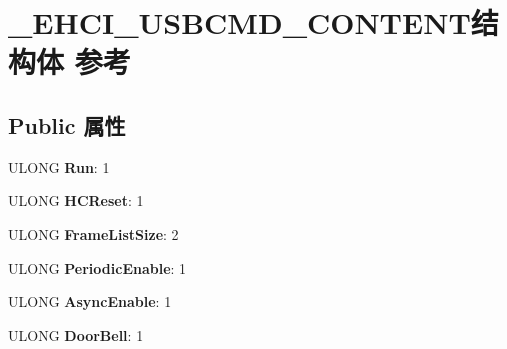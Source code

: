 \hypertarget{struct___e_h_c_i___u_s_b_c_m_d___c_o_n_t_e_n_t}{}\section{\+\_\+\+E\+H\+C\+I\+\_\+\+U\+S\+B\+C\+M\+D\+\_\+\+C\+O\+N\+T\+E\+N\+T结构体 参考}
\label{struct___e_h_c_i___u_s_b_c_m_d___c_o_n_t_e_n_t}
\subsection*{Public 属性}
\begin{DoxyCompactItemize}
\item 
\mbox{\label{struct___e_h_c_i___u_s_b_c_m_d___c_o_n_t_e_n_t_a17f0f6c4362c7cd9a99082a18525ad6a}} 
U\+L\+O\+NG {\bfseries Run}\+: 1
\item 
\mbox{\label{struct___e_h_c_i___u_s_b_c_m_d___c_o_n_t_e_n_t_a890c7694e01459bf668c79f5bef56214}} 
U\+L\+O\+NG {\bfseries H\+C\+Reset}\+: 1
\item 
\mbox{\label{struct___e_h_c_i___u_s_b_c_m_d___c_o_n_t_e_n_t_a7d61f73408e6afd88be60df03a0407c5}} 
U\+L\+O\+NG {\bfseries Frame\+List\+Size}\+: 2
\item 
\mbox{\label{struct___e_h_c_i___u_s_b_c_m_d___c_o_n_t_e_n_t_ab15cbbe5dadd6ade35fccc499408f334}} 
U\+L\+O\+NG {\bfseries Periodic\+Enable}\+: 1
\item 
\mbox{\label{struct___e_h_c_i___u_s_b_c_m_d___c_o_n_t_e_n_t_aa768ee34d817661e3e57a65c99ea3724}} 
U\+L\+O\+NG {\bfseries Async\+Enable}\+: 1
\item 
\mbox{\label{struct___e_h_c_i___u_s_b_c_m_d___c_o_n_t_e_n_t_a3ea5582558e2c065d403b767f936b807}} 
U\+L\+O\+NG {\bfseries Door\+Bell}\+: 1
\item 
\mbox{\label{struct___e_h_c_i___u_s_b_c_m_d___c_o_n_t_e_n_t_a1186b31cb30cb8067331ae17abb0c9e3}} 

\end{DoxyCompactItemize}
